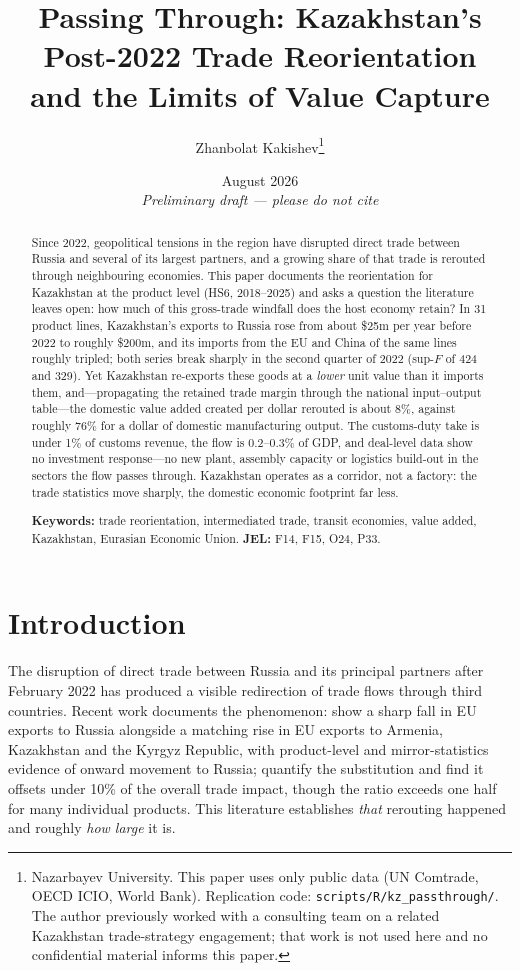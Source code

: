 \documentclass[12pt]{article}
\title{Passing Through: Kazakhstan's Post-2022 Trade Reorientation\\ and the Limits of Value Capture}
\author{Zhanbolat Kakishev\thanks{Nazarbayev University. This paper uses only public data
(UN Comtrade, OECD ICIO, World Bank). Replication code: \texttt{scripts/R/kz\_passthrough/}.
The author previously worked with a consulting team on a related Kazakhstan trade-strategy
engagement; that work is not used here and no confidential material informs this paper.}}
\date{August 2026 \\ \emph{Preliminary draft --- please do not cite}}
\begin{document}
\maketitle

\begin{abstract}
\noindent Since 2022, geopolitical tensions in the region have disrupted direct trade between
Russia and several of its largest partners, and a growing share of that trade is rerouted
through neighbouring economies. This paper documents the reorientation for Kazakhstan at the
product level (HS6, 2018--2025) and asks a question the literature leaves open: how much of
this gross-trade windfall does the host economy retain? In 31 product lines, Kazakhstan's
exports to Russia rose from about \$25m per year before 2022 to roughly \$200m, and its
imports from the EU and China of the same lines roughly tripled; both series break sharply in
the second quarter of 2022 (sup-$F$ of 424 and 329). Yet Kazakhstan re-exports these goods at
a \emph{lower} unit value than it imports them, and---propagating the retained trade margin
through the national input--output table---the domestic value added created per dollar
rerouted is about 8\%, against roughly 76\% for a dollar of domestic manufacturing output.
The customs-duty take is under 1\% of customs revenue, the flow is 0.2--0.3\% of GDP, and
deal-level data show no investment response---no new plant, assembly capacity or logistics
build-out in the sectors the flow passes through. Kazakhstan operates as a corridor, not a
factory: the trade statistics move sharply, the domestic economic footprint far less.

\medskip
\noindent\textbf{Keywords:} trade reorientation, intermediated trade, transit economies,
value added, Kazakhstan, Eurasian Economic Union. \quad \textbf{JEL:} F14, F15, O24, P33.
\end{abstract}

\clearpage

\section{Introduction}

The disruption of direct trade between Russia and its principal partners after February 2022
has produced a visible redirection of trade flows through third countries. Recent work
documents the phenomenon: \citet{chupilkin2026roundabout} show a sharp fall in EU exports to
Russia alongside a matching rise in EU exports to Armenia, Kazakhstan and the Kyrgyz Republic,
with product-level and mirror-statistics evidence of onward movement to Russia;
\citet{chupilkin2025intermediated} quantify the substitution and find it offsets under
10\% of the overall trade impact, though the ratio exceeds one half for many individual
products. This literature establishes \emph{that} rerouting happened and roughly \emph{how
large} it is.
\end{document}
